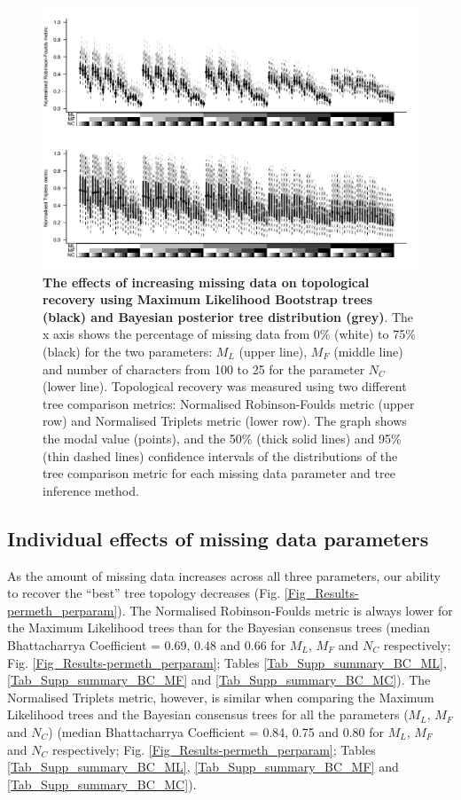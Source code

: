 \begin{figure}[!ht]
\centering
    \includegraphics[width=1\textwidth]{TEM/Figures/Boot+Bayt-AllParam-RF+Tr-BW.pdf}
    \caption[Effects of increasing missing data on topological recovery on bootstrap and posterior tree distribution]{\textbf{The effects of increasing missing data on topological recovery using Maximum Likelihood Bootstrap trees (black) and Bayesian posterior tree distribution (grey)}. The x axis shows the percentage of missing data from 0\% (white) to 75\% (black) for the two parameters: $M_{L}$ (upper line), $M_{F}$ (middle line) and number of characters from 100 to 25 for the parameter $N_{C}$ (lower line). Topological recovery was measured using two different tree comparison metrics: Normalised Robinson-Foulds metric (upper row) and Normalised Triplets metric (lower row). The graph shows the modal value (points), and the 50\% (thick solid lines) and 95\% (thin dashed lines) confidence intervals of the distributions of the tree comparison metric for each missing data parameter and tree inference method.} 
\label{Fig_Supp_BootBayt_allparam} 
\end{figure}

\subsection{Individual effects of missing data parameters}
As the amount of missing data increases across all three parameters, our ability to recover the ``best'' tree topology decreases (Fig. \ref{Fig_Results-permeth_perparam}).
The Normalised Robinson-Foulds metric is always lower for the Maximum Likelihood trees than for the Bayesian consensus trees (median Bhattacharrya Coefficient = 0.69, 0.48 and 0.66 for $M_{L}$, $M_{F}$ and $N_{C}$ respectively; Fig. \ref{Fig_Results-permeth_perparam}; Tables \ref{Tab_Supp_summary_BC_ML}, \ref{Tab_Supp_summary_BC_MF} and \ref{Tab_Supp_summary_BC_MC}). 
The Normalised Triplets metric, however, is similar when comparing the Maximum Likelihood trees and the Bayesian consensus trees for all the parameters ($M_{L}$, $M_{F}$ and $N_{C}$) (median Bhattacharrya Coefficient = 0.84, 0.75 and 0.80 for $M_{L}$, $M_{F}$ and $N_{C}$ respectively; Fig. \ref{Fig_Results-permeth_perparam}; Tables \ref{Tab_Supp_summary_BC_ML}, \ref{Tab_Supp_summary_BC_MF} and \ref{Tab_Supp_summary_BC_MC}).

